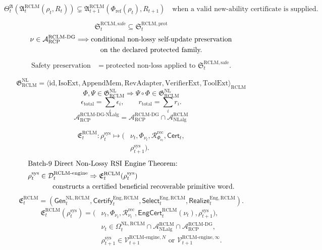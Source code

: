 \documentclass[11pt,a4paper]{article}
\newcommand{\Acal}{\mathcal A}
\newcommand{\Vcal}{\mathcal V}
\newcommand{\Dcal}{\mathcal D}
\newcommand{\id}{\mathrm{id}}
\newcommand{\RCP}{\mathrm{RCP}}
\newcommand{\RCLM}{\mathrm{RCLM}}
\newcommand{\DG}{\mathrm{DG}}
\newcommand{\sys}{\mathrm{sys}}
\newcommand{\rec}{\mathrm{rec}}
\newcommand{\safe}{\mathrm{safe}}
\newcommand{\prot}{\mathrm{prot}}
\newcommand{\engine}{\mathrm{engine}}
\newcommand{\NL}{\mathrm{NL}}
\newcommand{\IsoExt}{\mathrm{IsoExt}}
\newcommand{\AppendMem}{\mathrm{AppendMem}}
\newcommand{\RevAdapter}{\mathrm{RevAdapter}}
\newcommand{\VerifierExt}{\mathrm{VerifierExt}}
\newcommand{\ToolExt}{\mathrm{ToolExt}}
\newcommand{\NLalg}{\mathrm{NLalg}}
\newcommand{\Eng}{\mathrm{Eng}}
\begin{document}
\[
\Theta_t^{\mathfrak A}(\mathfrak A_t^{\RCLM}(\rho_t,R_t))
\subsetneq
\mathfrak A_{t+1}^{\RCLM}(\Phi_{\mathrm{ref}}(\rho_t),R_{t+1})
\quad\text{when a valid new-ability certificate is supplied.}
\]

\[
\mathfrak S_t^{\RCLM,\safe}\subseteq\mathfrak S_t^{\RCLM,\prot}
\]
\[
\begin{aligned}
\nu\in\Acal_{\RCP}^{\RCLM\text{-}\DG}
&\Longrightarrow
\text{conditional non-lossy self-update preservation}\\
&\hspace{3.5em}\text{on the declared protected family.}
\end{aligned}
\]
\[
\begin{aligned}
\text{Safety preservation}
&=\text{protected non-loss applied to }\mathfrak S_t^{\RCLM,\safe}.
\end{aligned}
\]

\[
\mathfrak G_{\RCLM}^{\NL}
=
\langle \id,\IsoExt,\AppendMem,\RevAdapter,\VerifierExt,\ToolExt\rangle_{\RCLM}
\]
\[
\Phi,\Psi\in\mathfrak G_{\RCLM}^{\NL}
\Longrightarrow
\Psi\circ\Phi\in\mathfrak G_{\RCLM}^{\NL}
\]
\[
\epsilon_{\mathrm{total}}=\sum_i\epsilon_i,
\qquad
r_{\mathrm{total}}=\sum_i r_i.
\]
\[
\Acal_{\RCP}^{\RCLM\text{-}\DG\text{-}\NLalg}
=
\Acal_{\RCP}^{\RCLM\text{-}\DG}\cap\Acal_{\NLalg}^{\RCLM}
\]

\[
\begin{aligned}
\mathfrak E_t^{\RCLM}:\rho_t^{\sys}\mapsto
(&\nu_t,\Phi_{\nu_t},\mathcal R_{\Phi_{\nu_t}}^{\rec},\mathsf{Cert}_t,\\
&\rho_{t+1}^{\sys}).
\end{aligned}
\]
\[
\begin{aligned}
&\text{Batch-9 Direct Non-Lossy RSI Engine Theorem:}\\
&\rho_t^{\sys}\in\Dcal_t^{\RCLM\text{-}\engine}
\Rightarrow
\mathfrak E_t^{\RCLM}(\rho_t^{\sys})\\
&\hspace{3.5em}\text{constructs a certified beneficial recoverable primitive word.}
\end{aligned}
\]
\[
\mathfrak E_t^{\RCLM}
=(\mathsf{Gen}_t^{\NL,\RCLM},
\mathsf{Certify}_t^{\Eng,\RCLM},
\mathsf{Select}_t^{\Eng,\RCLM},
\mathsf{Realize}_t^{\Eng,\RCLM}).
\]
\[
\begin{aligned}
\mathfrak E_t^{\RCLM}(\rho_t^{\sys})
=(&\nu_t,\Phi_{\nu_t},\mathcal R_{\nu_t}^{\rec},
\mathsf{EngCert}_t^{\RCLM}(\nu_t),\rho_{t+1}^{\sys}),\\
&\nu_t\in\Omega_t^{\NL,\RCLM}\cap\Acal_{\NLalg}^{\RCLM}\cap\Acal_{\RCP}^{\RCLM\text{-}\DG},\\
&\rho_{t+1}^{\sys}\in\Vcal_{t+1}^{\RCLM\text{-}\engine,N}\text{ or }\Vcal_{t+1}^{\RCLM\text{-}\engine,\infty}.
\end{aligned}
\]
\end{document}
